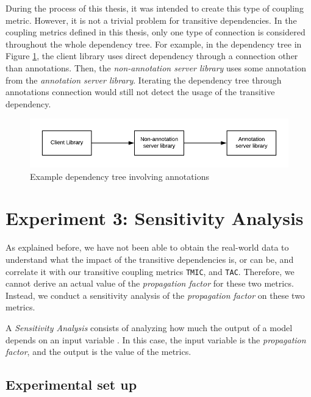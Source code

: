 During the process of this thesis, it was intended to create this type of coupling metric. However, it is not a trivial problem for transitive dependencies. In the coupling metrics defined in this thesis, only one type of connection is considered throughout the whole dependency tree. For example, in the dependency tree in Figure \ref{fig:annotation-dependencies}, the client library uses direct dependency through a connection other than annotations. Then, the \textit{non-annotation server library} uses some annotation from the \textit{annotation server library}. Iterating the dependency tree through annotations connection would still not detect the usage of the transitive dependency.

\begin{figure}[ht!]
\begin{center}
\includegraphics[width=\textwidth]{figures/Transitivity-Annotations.png}
\caption{Example dependency tree involving annotations}
\label{fig:annotation-dependencies}
\end{center}
\end{figure}

\section{Experiment 3: Sensitivity Analysis}
As explained before, we have not been able to obtain the real-world data to understand what the impact of the transitive dependencies is, or can be, and correlate it with our transitive coupling metrics \texttt{TMIC}, and \texttt{TAC}. Therefore, we cannot derive an actual value of the \textit{propagation factor} for these two metrics. Instead, we conduct a sensitivity analysis of the \textit{propagation factor} on these two metrics.

A \textit{Sensitivity Analysis} consists of analyzing how much the output of a model depends on an input variable \cite{Iooss2016}. In this case, the input variable is the \textit{propagation factor}, and the output is the value of the metrics.

\subsection{Experimental set up}

